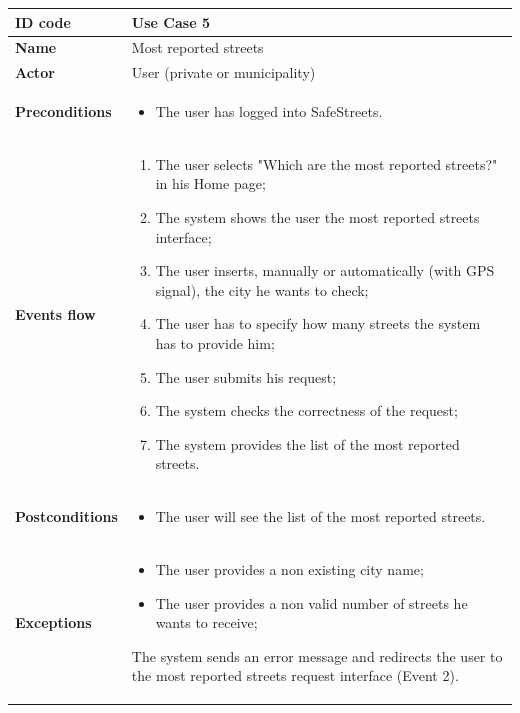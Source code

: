 \documentclass[titlepage]{article}
\begin{document}
\newpage

\begin{longtable}{| p{3 cm} | p{10 cm} |} 
\hline

\textbf{ID code} & Use Case 5 \\ \hline
\textbf{Name} & Most reported streets \\ \hline
\textbf{Actor} & User (private or municipality) \\ \hline
\textbf{Preconditions} & 
\begin{itemize}
\item The user has logged into SafeStreets.
\end{itemize} \\ \hline
\textbf{Events flow} & 
\begin{enumerate}
\item The user selects "Which are the most reported streets?" in his Home page;
\item The system shows the user the most reported streets interface;
\item The user inserts, manually or automatically (with GPS signal), the city he wants to check;
\item The user has to specify how many streets the system has to provide him;
\item The user submits his request;
\item The system checks the correctness of the request;
\item The system provides the list of the most reported streets.
\end{enumerate} \\ \hline
\textbf{Postconditions} & 
\begin{itemize}
\item The user will see the list of the most reported streets.
\end{itemize} \\ \hline
\textbf{Exceptions} &
\begin{itemize}
\item The user provides a non existing city name;
\item The user provides a non valid number of streets he wants to receive;
\end{itemize}
The system sends an error message and redirects the user to the most reported streets request interface (Event 2). \\ \hline

\end{longtable}

\newpage
\end{document}
